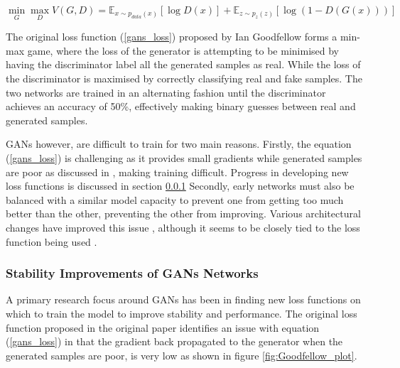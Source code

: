 \documentclass[12pt]{article}
\begin{document}
\begin{equation} \label{gans_loss}
    \min_{G} \max_{D} V(G, D) = \mathbb{E}_{x \sim p_{data}(x)} [\log D(x)]
                              + \mathbb{E}_{z \sim p_{z}(z)} [\log (1 - D(G(x)))]
\end{equation}

\noindent The original loss function (\ref{gans_loss}) proposed by Ian Goodfellow forms a min-max game, where the loss of the generator is attempting to be minimised by having the discriminator label all the generated samples as real.
While the loss of the discriminator is maximised by correctly classifying real and fake samples.
The two networks are trained in an alternating fashion until the discriminator achieves an accuracy of 50\%, effectively making binary guesses between real and generated samples.

GANs however, are difficult to train for two main reasons.
Firstly, the equation (\ref{gans_loss}) is challenging as it provides small gradients while generated samples are poor as discussed in \cite{Goodfellow2014}, making training difficult.
Progress in developing new loss functions is discussed in section \ref{Stability_to_GANs}
Secondly, early networks must also be balanced with a similar model capacity to prevent one from getting too much better than the other, preventing the other from improving.
Various architectural changes have improved this issue \cite{Radford2016, Zhang2018}, although it seems to be closely tied to the loss function being used \cite{Gulrajani2017}.

\subsubsection{Stability Improvements of GANs Networks} \label{Stability_to_GANs}
A primary research focus around GANs has been in finding new loss functions on which to train the model to improve stability and performance.
The original loss function proposed in the original paper \cite{Goodfellow2014} identifies an issue with equation (\ref{gans_loss}) in that the gradient back propagated to the generator when the generated samples are poor, is very low as shown in figure \ref{fig:Goodfellow_plot}.
\end{document}
